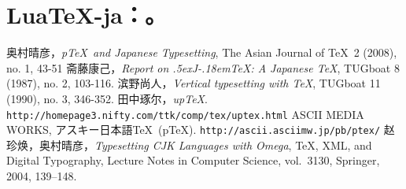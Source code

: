 \documentclass{zh-article}
\def\JTeX{\leavevmode\hbox{\lower.5ex\hbox{J}\kern-.18em\TeX}}
\def\pTeX{p\TeX}
\def\upTeX{up\TeX}
\def\LuaTeX{Lua\TeX}
\begin{document}
\section{\LuaTeX-ja：。}

\begin{thebibliography}{99}
奥村晴彦，{\it \pTeX\ and Japanese Typesetting\/}, The Asian Journal of \TeX\ 2 (2008), no. 1, 43-51
斋藤康己，{\it Report on \JTeX: A Japanese \TeX\/}, TUGboat 8 (1987), no. 2, 103-116.
滨野尚人，{\it Vertical typesetting with \TeX\/}, TUGboat 11 (1990), no. 3, 346-352.
田中琢尔，{\it \upTeX\/}. \texttt{http://homepage3.nifty.com/ttk/comp/tex/uptex.html}
ASCII MEDIA WORKS, {\hei アスキー日本語\TeX\ (\pTeX)}. \texttt{http://ascii.asciimw.jp/pb/ptex/}
赵珍焕，奥村晴彦，{\it Typesetting CJK Languages with Omega\/}, \TeX, XML, and Digital Typography, Lecture Notes in Computer Science, vol.~3130, Springer, 2004, 139--148.
\end{thebibliography}
\end{document}
